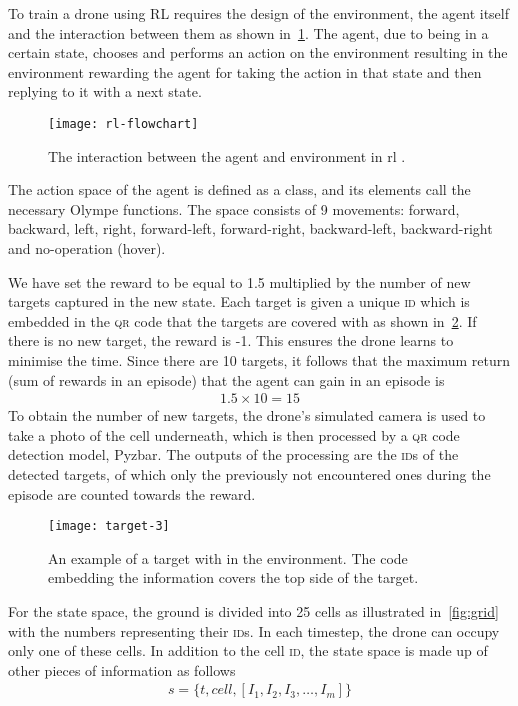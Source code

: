\documentclass[../main.tex]{subfiles}
\begin{document}
To train a drone using RL requires the
design of the environment, the agent itself and
the interaction between them as shown in~\cref{fig:rl}. 
The agent, due to being in a certain state, chooses and 
performs an action on
the environment resulting in the environment 
rewarding the agent for taking the action in that state
and then replying to it with a next state.

\begin{figure}[tbp]
	\centering
	\texttt{[image: rl-flowchart]}
	\caption{The interaction between the agent and environment
        in \gls{rl} \cite{Sut20}.}
	\label{fig:rl}
\end{figure}

The action space of the agent is defined as a class, and its
elements call the necessary Olympe functions. 
The space consists of 9 movements: 
forward, backward, left,
right, forward-left, forward-right, backward-left,
backward-right and no-operation (hover).

We have set the reward to be equal to 1.5 multiplied by 
the number of new targets captured in the new state.
Each target is given a unique \textsc{id} which 
is embedded in the \textsc{qr} code that the targets are covered with
as shown in~\cref{fig:target}.
If there is no new target, the reward is -1. 
This ensures the drone learns to
minimise the time.
Since there are 10 targets, it follows that the maximum
return (sum of rewards in an episode) that the agent can gain  
in an episode is 
\begin{align}
        1.5 \times 10 = 15
\end{align}
To obtain the number of new targets, the drone's simulated camera is
used to take a photo of the cell
underneath, which is then processed by a \textsc{qr} code detection 
model, Pyzbar. 
The outputs of the processing are the \textsc{id}s of 
the detected targets, 
of which only the previously not encountered ones during 
the episode are counted towards the reward.

\begin{figure}[tbp]
	\centering
	\texttt{[image: target-3]}
        \caption{An example of a target with  in the environment.
        The \qr code embedding the \id information covers the top side
        of the target.}
	\label{fig:target}
\end{figure}

For the state space, the ground is divided into 25 cells as
illustrated in~\cref{fig:grid} with the numbers representing their
\textsc{id}s. 
In each timestep, the drone can occupy only one of these cells.
In addition to the cell \textsc{id}, the state space is made up of
other pieces of information as follows
\begin{align}
	s = \{ t, cell, [ I_1, I_2, I_3, \ldots, I_m] \} 
	\label{eq:state-space}
\end{align}
\end{document}
